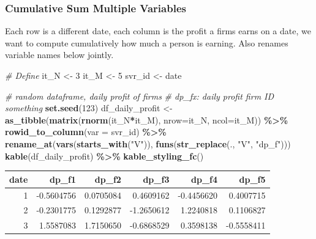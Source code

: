 \documentclass[
]{book}
\newenvironment{Shaded}{\begin{snugshade}}{\end{snugshade}}
\newcommand{\CommentTok}[1]{\textcolor[rgb]{0.56,0.35,0.01}{\textit{#1}}}
\newcommand{\DataTypeTok}[1]{\textcolor[rgb]{0.13,0.29,0.53}{#1}}
\newcommand{\DecValTok}[1]{\textcolor[rgb]{0.00,0.00,0.81}{#1}}
\newcommand{\KeywordTok}[1]{\textcolor[rgb]{0.13,0.29,0.53}{\textbf{#1}}}
\newcommand{\NormalTok}[1]{#1}
\newcommand{\OperatorTok}[1]{\textcolor[rgb]{0.81,0.36,0.00}{\textbf{#1}}}
\newcommand{\StringTok}[1]{\textcolor[rgb]{0.31,0.60,0.02}{#1}}
\begin{document}
\hypertarget{cumulative-sum-multiple-variables}{%
\subsubsection{Cumulative Sum Multiple Variables}\label{cumulative-sum-multiple-variables}}

Each row is a different date, each column is the profit a firms earns on a date, we want to compute cumulatively how much a person is earning. Also renames variable names below jointly.

\begin{Shaded}
\begin{Highlighting}[]
\CommentTok{\# Define}
\NormalTok{it\_N \textless{}{-}}\StringTok{ }\DecValTok{3}
\NormalTok{it\_M \textless{}{-}}\StringTok{ }\DecValTok{5}
\NormalTok{svr\_id \textless{}{-}}\StringTok{ \textquotesingle{}date\textquotesingle{}}

\CommentTok{\# random dataframe, daily profit of firms}
\CommentTok{\# dp\_fx: daily profit firm ID something}
\KeywordTok{set.seed}\NormalTok{(}\DecValTok{123}\NormalTok{)}
\NormalTok{df\_daily\_profit \textless{}{-}}\StringTok{ }\KeywordTok{as\_tibble}\NormalTok{(}\KeywordTok{matrix}\NormalTok{(}\KeywordTok{rnorm}\NormalTok{(it\_N}\OperatorTok{*}\NormalTok{it\_M), }\DataTypeTok{nrow=}\NormalTok{it\_N, }\DataTypeTok{ncol=}\NormalTok{it\_M)) }\OperatorTok{\%\textgreater{}\%}
\StringTok{  }\KeywordTok{rowid\_to\_column}\NormalTok{(}\DataTypeTok{var =}\NormalTok{ svr\_id) }\OperatorTok{\%\textgreater{}\%}
\StringTok{  }\KeywordTok{rename\_at}\NormalTok{(}\KeywordTok{vars}\NormalTok{(}\KeywordTok{starts\_with}\NormalTok{(}\StringTok{"V"}\NormalTok{)),}
            \KeywordTok{funs}\NormalTok{(}\KeywordTok{str\_replace}\NormalTok{(., }\StringTok{"V"}\NormalTok{, }\StringTok{"dp\_f"}\NormalTok{)))}
\KeywordTok{kable}\NormalTok{(df\_daily\_profit) }\OperatorTok{\%\textgreater{}\%}
\StringTok{  }\KeywordTok{kable\_styling\_fc}\NormalTok{()}
\end{Highlighting}
\end{Shaded}

\begin{table}[!h]
\centering
\begin{tabular}{r|r|r|r|r|r}
\hline
date & dp\_f1 & dp\_f2 & dp\_f3 & dp\_f4 & dp\_f5\\
\hline
\rowcolor{gray!6}  1 & -0.5604756 & 0.0705084 & 0.4609162 & -0.4456620 & 0.4007715\\
\hline
2 & -0.2301775 & 0.1292877 & -1.2650612 & 1.2240818 & 0.1106827\\
\hline
\rowcolor{gray!6}  3 & 1.5587083 & 1.7150650 & -0.6868529 & 0.3598138 & -0.5558411\\
\hline
\end{tabular}
\end{table}
\end{document}
